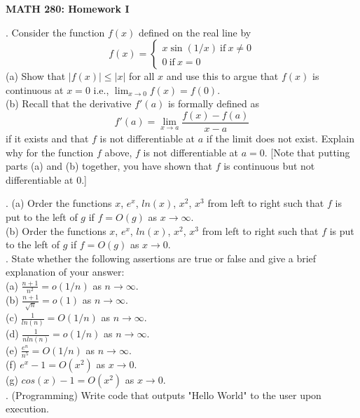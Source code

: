 \documentclass[12 pt]{article}
\newcommand{\sine}{\operatorname{sin}}
\begin{document}
\centerline{\bf MATH 280: Homework I}

\bigskip

. Consider the function $f(x)$ defined on the real line by
$$
f(x) = \begin{cases}
x \sine(1/x) \ \text{if} \  x \neq 0 \\
0 \ \text{if} \  x = 0
\end{cases}
$$
(a) Show that $|f(x)| \leq |x|$ for all $x$ and use this to argue that 
$f(x)$ is continuous at $x=0$ i.e., $\displaystyle\lim_{x \to 0} f(x) = f(0)$. \\

\noindent
(b) Recall that the derivative $f'(a)$ is formally defined as 
$$
f'(a) = \lim_{x \to a} \frac{f(x)-f(a)}{x-a}
$$
if it exists and that $f$ is not differentiable at $a$ if the limit does not exist. 
Explain why for the function $f$ above, $f$ is not differentiable at $a=0$.
[Note that putting parts (a) and (b) together, you have shown that $f$ is continuous 
but not differentiable at $0$.]

\medskip

. 
(a) Order the functions $x$, $e^x$, $ln(x)$, $x^2$, $x^3$ from left to right such 
that $f$ is put to the left of $g$ if $f=O(g)$ as $x \to \infty$. \\

\noindent
(b) Order the functions $x$, $e^x$, $ln(x)$, $x^2$, $x^3$ from left to right 
such that $f$ is put to the left of $g$ if $f=O(g)$ as $x \to 0$. \\

. State whether the following assertions are true or false and give a brief explanation of your answer: \\
(a) $\frac{n+1}{n^2} = o(1/n)$ as $n \to \infty$. \\
(b) $\frac{n+1}{\sqrt{n}}=o(1)$ as $n \to \infty$. \\
(c) $\frac{1}{ln(n)} = O(1/n)$ as $n \to \infty$. \\
(d) $\frac{1}{n ln(n)} = o(1/n)$ as $n \to \infty$. \\
(e) $\frac{e^n}{n^5} = O(1/n)$ as $n \to \infty$. \\
(f) $e^x-1 = O(x^2)$ as $x \to 0$. \\
(g) $cos(x)-1 = O(x^2)$ as $x \to 0$. \\

. (Programming)
Write code that outputs "Hello World" to the user upon execution.
\end{document}
